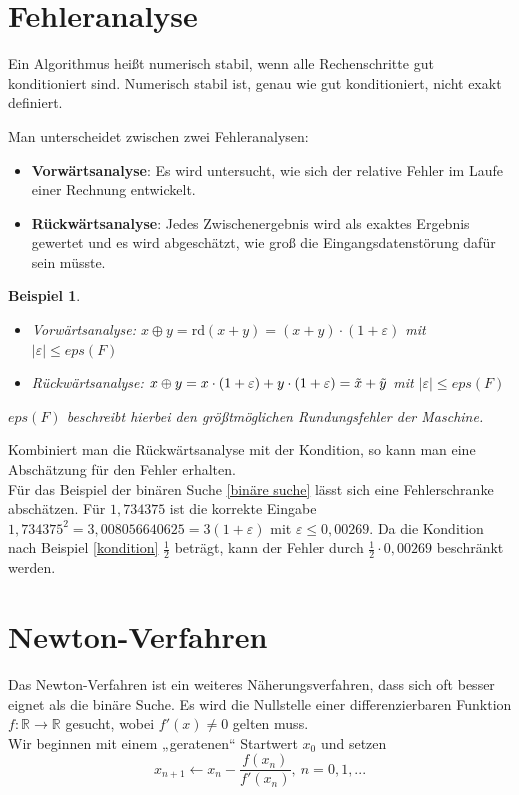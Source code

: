 \documentclass[12pt]{article}
\newcommand{\R}{\mathbb{R}} %
\newtheorem{beispiel}[satz]{Beispiel}
\begin{document}
\newpage
\section{Fehleranalyse}
Ein Algorithmus heißt numerisch stabil, wenn alle Rechenschritte gut konditioniert sind. Numerisch stabil ist, genau wie gut konditioniert, nicht exakt definiert. 

\noindent Man unterscheidet zwischen zwei Fehleranalysen: 
\begin{itemize}
    \item \textbf{Vorwärtsanalyse}: Es wird untersucht, wie sich der relative Fehler im Laufe einer Rechnung entwickelt.
    \item \textbf{Rückwärtsanalyse}: Jedes Zwischenergebnis wird als exaktes Ergebnis gewertet und es wird abgeschätzt, wie groß die Eingangsdatenstörung dafür sein müsste. 
\end{itemize}

\begin{beispiel}
    \begin{itemize}
        \item Vorwärtsanalyse: $x \oplus y = \mathrm{rd}(x+y)= (x+y) \cdot(1+ \varepsilon)$ mit $|\varepsilon| \leq eps(F)$
        \item Rückwärtsanalyse: $x\oplus y= x \cdot (1+ \varepsilon)+y\cdot (1+\varepsilon)=\Tilde{x}+ \Tilde{y}$ mit $|\varepsilon|\leq eps(F)$
    \end{itemize} 
     \vspace{\baselineskip}
   \noindent $eps(F)$ beschreibt hierbei den größtmöglichen Rundungsfehler der Maschine. 
\end{beispiel}

\noindent Kombiniert man die Rückwärtsanalyse mit der Kondition, so kann man eine Abschätzung für den Fehler erhalten. \\ 
Für das Beispiel der binären Suche \ref{binäre suche} lässt sich eine Fehlerschranke abschätzen. Für $1,734375$ ist die korrekte Eingabe $1,734375^2=3,008056640625=3(1+\varepsilon)$ mit $\varepsilon \leq 0,00269$. Da die Kondition nach Beispiel \ref{kondition} $\frac{1}{2}$ beträgt, kann der Fehler durch $\frac{1}{2}\cdot 0,00269$ beschränkt werden.

\newpage
\section{Newton-Verfahren}
Das Newton-Verfahren ist ein weiteres Näherungsverfahren, dass sich oft besser eignet als die binäre Suche. Es wird die Nullstelle einer differenzierbaren Funktion $f: \R \to \R$ gesucht, wobei $f'(x) \neq0$ gelten muss. \\ 
Wir beginnen mit einem „geratenen“ Startwert $x_0$ und setzen
\begin{equation*}
    x_{n+1} \leftarrow x_n - \frac{f(x_n)}{f'(x_n)}, \: n=0,1,...
\end{equation*}
\end{document}
